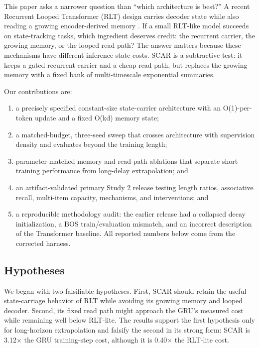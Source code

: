 \documentclass{article}
\begin{document}
This paper asks a narrower question than ``which architecture is best?'' A
recent Recurrent Looped Transformer (RLT) design carries decoder state while
also reading a growing encoder-derived memory \cite{zhang2026rlt}. If a small
RLT-like model succeeds on state-tracking tasks, which ingredient deserves
credit: the recurrent carrier, the growing memory, or the looped read path?
The answer matters because these mechanisms have different inference-state
costs. SCAR is a subtractive test: it keeps a gated recurrent carrier and a
cheap read path, but replaces the growing memory with a fixed bank of
multi-timescale exponential summaries.

Our contributions are:
\begin{enumerate}
\item a precisely specified constant-size state-carrier architecture with an
O(1)-per-token update and a fixed O(kd) memory state;
\item a matched-budget, three-seed sweep that crosses architecture with
supervision density and evaluates beyond the training length;
\item parameter-matched memory and read-path ablations that separate short
training performance from long-delay extrapolation; and
\item an artifact-validated primary Study 2 release testing length ratios, associative
recall, multi-item capacity, mechanisms, and interventions; and
\item a reproducible methodology audit: the earlier release had a collapsed
decay initialization, a BOS train/evaluation mismatch, and an incorrect
description of the Transformer baseline. All reported numbers below come from
the corrected harness.
\end{enumerate}

\subsection{Hypotheses}
We began with two falsifiable hypotheses. First, SCAR should retain the useful
state-carriage behavior of RLT while avoiding its growing memory and looped
decoder. Second, its fixed read path might approach the GRU's measured cost
while remaining well below RLT-lite. The results support the first hypothesis
only for long-horizon extrapolation and falsify the second in its strong form:
SCAR is 3.12$\times$ the GRU training-step cost, although it is 0.40$\times$
the RLT-lite cost.
\end{document}
